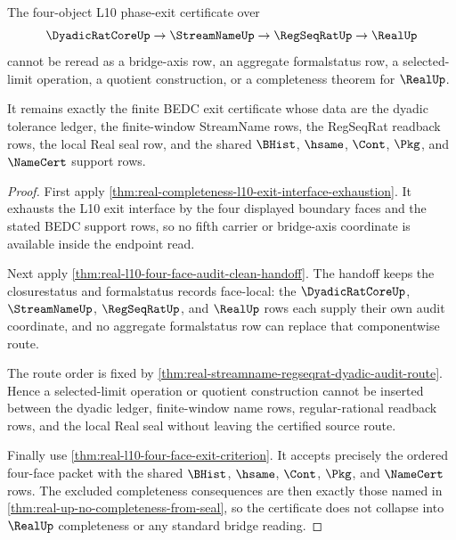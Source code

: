 \begin{theorem}
\label{thm:real-l10-four-object-phase-exit-no-bridge-collapse}
The four-object L10 phase-exit certificate over
$$
\DyadicRatCoreUp \to \StreamNameUp \to \RegSeqRatUp \to \RealUp
$$
cannot be reread as a bridge-axis row, an aggregate formalstatus row, a selected-limit operation, a quotient construction, or a completeness theorem for $\RealUp$.

It remains exactly the finite BEDC exit certificate whose data are the dyadic tolerance ledger, the finite-window StreamName rows, the RegSeqRat readback rows, the local Real seal row, and the shared $\BHist$, $\hsame$, $\Cont$, $\Pkg$, and $\NameCert$ support rows.
\end{theorem}
\begin{proof}
First apply \autoref{thm:real-completeness-l10-exit-interface-exhaustion}. It exhausts the L10 exit interface by the four displayed boundary faces and the stated BEDC support rows, so no fifth carrier or bridge-axis coordinate is available inside the endpoint read.

Next apply \autoref{thm:real-l10-four-face-audit-clean-handoff}. The handoff keeps the closurestatus and formalstatus records face-local: the $\DyadicRatCoreUp$, $\StreamNameUp$, $\RegSeqRatUp$, and $\RealUp$ rows each supply their own audit coordinate, and no aggregate formalstatus row can replace that componentwise route.

The route order is fixed by \autoref{thm:real-streamname-regseqrat-dyadic-audit-route}. Hence a selected-limit operation or quotient construction cannot be inserted between the dyadic ledger, finite-window name rows, regular-rational readback rows, and the local Real seal without leaving the certified source route.

Finally use \autoref{thm:real-l10-four-face-exit-criterion}. It accepts precisely the ordered four-face packet with the shared $\BHist$, $\hsame$, $\Cont$, $\Pkg$, and $\NameCert$ rows. The excluded completeness consequences are then exactly those named in \autoref{thm:real-up-no-completeness-from-seal}, so the certificate does not collapse into $\RealUp$ completeness or any standard bridge reading.
\end{proof}

